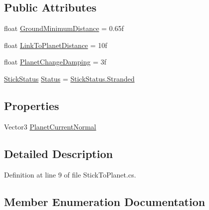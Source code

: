 \subsection*{Public Attributes}
\begin{DoxyCompactItemize}
\item 
float \hyperlink{class_g_t_core_1_1_player_1_1_stick_to_planet_abda4ff29f854ffcb71426930c1291182}{Ground\+Minimum\+Distance} = 0.\+65f
\item 
float \hyperlink{class_g_t_core_1_1_player_1_1_stick_to_planet_a88684571f58f674e9de3a305f87e4b53}{Link\+To\+Planet\+Distance} = 10f
\item 
float \hyperlink{class_g_t_core_1_1_player_1_1_stick_to_planet_a5ccaddd5d4bdc14fc1c289fca645c470}{Planet\+Change\+Damping} = 3f
\item 
\hyperlink{class_g_t_core_1_1_player_1_1_stick_to_planet_ab080d35c69764b3967026265d41fff67}{Stick\+Status} \hyperlink{class_g_t_core_1_1_player_1_1_stick_to_planet_a7fb03985d99e5effac6072d51c59811e}{Status} = \hyperlink{class_g_t_core_1_1_player_1_1_stick_to_planet_ab080d35c69764b3967026265d41fff67a0b39370ea87ef482a4def72565f537a4}{Stick\+Status.\+Stranded}
\end{DoxyCompactItemize}
\subsection*{Properties}
\begin{DoxyCompactItemize}
\item 
Vector3 \hyperlink{class_g_t_core_1_1_player_1_1_stick_to_planet_a2987fbd9ccbaba54cc7fa12b2d2d858e}{Planet\+Current\+Normal}
\end{DoxyCompactItemize}


\subsection{Detailed Description}


Definition at line 9 of file Stick\+To\+Planet.\+cs.



\subsection{Member Enumeration Documentation}
\hypertarget{class_g_t_core_1_1_player_1_1_stick_to_planet_ab080d35c69764b3967026265d41fff67}{}
